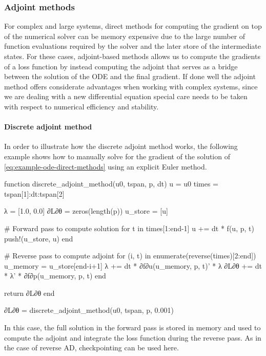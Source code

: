 \subsubsection{Adjoint methods}
\label{section:computing-adjoints}


For complex and large systems, direct methods for computing the gradient on top of the numerical solver can be memory expensive due to the large number of function evaluations required by the solver and the later store of the intermediate states. 
For these cases, adjoint-based methods allows us to compute the gradients of a loss function by instead computing the adjoint that serves as a bridge between the solution of the ODE and the final gradient. 
If done well the adjoint method offers considerate advantages when working with complex systems, since we are dealing with a new differential equation special care needs to be taken with respect to numerical efficiency and stability.

\paragraph{Discrete adjoint method}

In order to illustrate how the discrete adjoint method works, the following example shows how to manually solve for the gradient of the solution of \eqref{eq:example-ode-direct-methods} using an explicit Euler method. 
\begin{jllisting}
function discrete_adjoint_method(u0, tspan, p, dt)
    u = u0
    times = tspan[1]:dt:tspan[2]

    λ = [1.0, 0.0]
    ∂L∂θ = zeros(length(p))
    u_store = [u]

    # Forward pass to compute solution
    for t in times[1:end-1]
        u += dt * f(u, p, t)
        push!(u_store, u)
    end

    # Reverse pass to compute adjoint
    for (i, t) in enumerate(reverse(times)[2:end])
        u_memory = u_store[end-i+1]
        λ += dt * ∂f∂u(u_memory, p, t)' * λ
        ∂L∂θ += dt * λ' * ∂f∂p(u_memory, p, t)
    end

    return ∂L∂θ
end

∂L∂θ = discrete_adjoint_method(u0, tspan, p, 0.001) 
\end{jllisting}
In this case, the full solution in the forward pass is stored in memory and used to compute the adjoint and integrate the loss function during the reverse pass. 
As in the case of reverse AD, checkpointing can be used here. 

